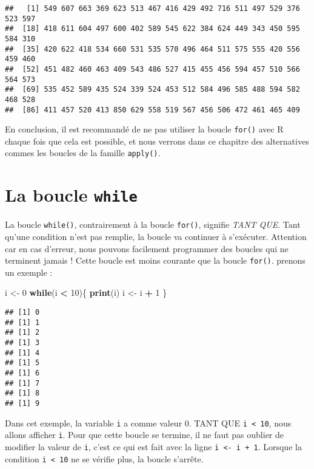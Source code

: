 \documentclass[]{book}
\newenvironment{Shaded}{\begin{snugshade}}{\end{snugshade}}
\newcommand{\KeywordTok}[1]{\textcolor[rgb]{0.13,0.29,0.53}{\textbf{#1}}}
\newcommand{\DecValTok}[1]{\textcolor[rgb]{0.00,0.00,0.81}{#1}}
\newcommand{\StringTok}[1]{\textcolor[rgb]{0.31,0.60,0.02}{#1}}
\newcommand{\ControlFlowTok}[1]{\textcolor[rgb]{0.13,0.29,0.53}{\textbf{#1}}}
\newcommand{\OperatorTok}[1]{\textcolor[rgb]{0.81,0.36,0.00}{\textbf{#1}}}
\newcommand{\NormalTok}[1]{#1}
\theoremstyle{definition}
\theoremstyle{definition}
\theoremstyle{definition}
\theoremstyle{remark}
\begin{document}
\begin{verbatim}
##   [1] 549 607 663 369 623 513 467 416 429 492 716 511 497 529 376 523 597
##  [18] 418 611 604 497 600 402 589 545 622 384 624 449 343 450 595 584 310
##  [35] 420 622 418 534 660 531 535 570 496 464 511 575 555 420 556 459 460
##  [52] 451 482 460 463 409 543 486 527 415 455 456 594 457 510 566 564 573
##  [69] 535 452 589 435 524 339 524 453 512 584 496 585 488 594 582 468 528
##  [86] 411 457 520 413 850 629 558 519 567 456 506 472 461 465 409
\end{verbatim}

En conclusion, il est recommandé de ne pas utiliser la boucle
\texttt{for()} avec R chaque fois que cela est possible, et nous verrons
dans ce chapitre des alternatives commes les boucles de la famille
\texttt{apply()}.

\hypertarget{l17while}{\section{\texorpdfstring{La boucle
\texttt{while}}{La boucle while}}\label{l17while}}

La boucle \texttt{while()}, contrairement à la boucle \texttt{for()},
signifie \emph{TANT QUE}. Tant qu'une condition n'est pas remplie, la
boucle va continuer à s'exécuter. Attention car en cas d'erreur, nous
pouvons facilement programmer des boucles qui ne terminent jamais !
Cette boucle est moins courante que la boucle \texttt{for()}. prenons un
exemple :

\begin{Shaded}
\begin{Highlighting}[]
\NormalTok{i <-}\StringTok{ }\DecValTok{0}
\ControlFlowTok{while}\NormalTok{(i }\OperatorTok{<}\StringTok{ }\DecValTok{10}\NormalTok{)\{}
  \KeywordTok{print}\NormalTok{(i)}
\NormalTok{  i <-}\StringTok{ }\NormalTok{i }\OperatorTok{+}\StringTok{ }\DecValTok{1}
\NormalTok{\}}
\end{Highlighting}
\end{Shaded}

\begin{verbatim}
## [1] 0
## [1] 1
## [1] 2
## [1] 3
## [1] 4
## [1] 5
## [1] 6
## [1] 7
## [1] 8
## [1] 9
\end{verbatim}

Dans cet exemple, la variable \texttt{i} a comme valeur 0. TANT QUE
\texttt{i\ \textless{}\ 10}, nous allons afficher \texttt{i}. Pour que
cette boucle se termine, il ne faut pas oublier de modifier la valeur de
\texttt{i}, c'est ce qui est fait avec la ligne
\texttt{i\ \textless{}-\ i\ +\ 1}. Lorsque la condition
\texttt{i\ \textless{}\ 10} ne se vérifie plus, la boucle s'arrête.
\end{document}
